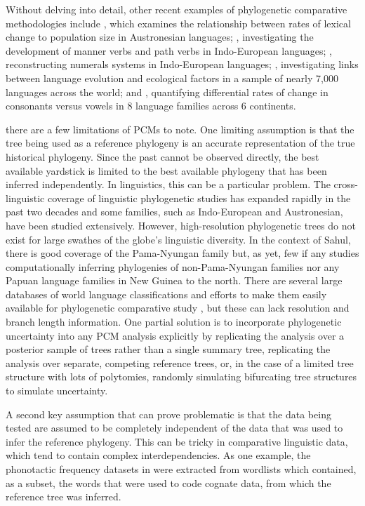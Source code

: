 Without delving into detail, other recent examples of phylogenetic comparative methodologies include \textcite{bromham_rate_2015}, which examines the relationship between rates of lexical change to population size in Austronesian languages; \textcite{verkerk_where_2015}, investigating the development of manner verbs and path verbs in Indo-European languages; \textcite{calude_typology_2016}, reconstructing numerals systems in Indo-European languages; \textcite{bentz_evolution_2018}, investigating links between language evolution and ecological factors in a sample of nearly 7,000 languages across the world; and \textcite{moran_investigating_2020}, quantifying differential rates of change in consonants versus vowels in 8 language families across 6 continents.

there are a few limitations of PCMs to note. One limiting assumption is that the tree being used as a reference phylogeny is an accurate representation of the true historical phylogeny. Since the past cannot be observed directly, the best available yardstick is limited to the best available phylogeny that has been inferred independently. In linguistics, this can be a particular problem. The cross-linguistic coverage of linguistic phylogenetic studies has expanded rapidly in the past two decades and some families, such as Indo-European and Austronesian, have been studied extensively. However, high-resolution phylogenetic trees do not exist for large swathes of the globe's linguistic diversity. In the context of Sahul, there is good coverage of the Pama-Nyungan family \autocites{bowern_computational_2012}{bouckaert_origin_2018} but, as yet, few if any studies computationally inferring phylogenies of non-Pama-Nyungan families nor any Papuan language families in New Guinea to the north. There are several large databases of world language classifications and efforts to make them easily available for phylogenetic comparative study \autocite{dediu_making_2018}, but these can lack resolution and branch length information. One partial solution is to incorporate phylogenetic uncertainty into any PCM analysis explicitly by replicating the analysis over a posterior sample of trees rather than a single summary tree, replicating the analysis over separate, competing reference trees, or, in the case of a limited tree structure with lots of polytomies, randomly simulating bifurcating tree structures to simulate uncertainty.

A second key assumption that can prove problematic is that the data being tested are assumed to be completely independent of the data that was used to infer the reference phylogeny. This can be tricky in comparative linguistic data, which tend to contain complex interdependencies. As one example, the phonotactic frequency datasets in \textcite{macklin-cordes_phylogenetic_2020} were extracted from wordlists which contained, as a subset, the words that were used to code cognate data, from which the reference tree was inferred.

